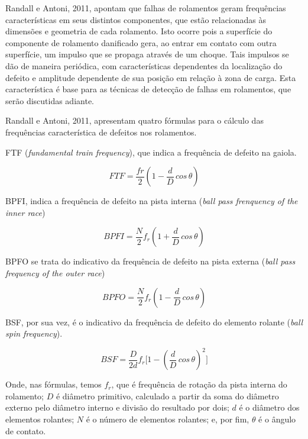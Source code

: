 \documentclass[
	12pt,				
	oneside,			
	a4paper,			
	english,			
	brazil,			
	]{abntex2ppgsi}
\begin{document}
Randall e Antoni, 2011, apontam que falhas de rolamentos geram frequências características em seus distintos componentes, que estão relacionadas às dimensões e geometria de cada rolamento. Isto ocorre pois a superfície do componente de rolamento danificado gera, ao entrar em contato com outra superfície, um impulso que se propaga através de um choque. Tais impulsos se dão de maneira periódica, com características dependentes da localização do defeito e amplitude dependente de sua posição em relação à zona de carga. Esta característica é base para as técnicas de detecção de falhas em rolamentos, que serão discutidas adiante.


Randall e Antoni, 2011, apresentam quatro fórmulas para o cálculo das frequências característica de defeitos nos rolamentos.

FTF (\textit{fundamental train frequency}), que indica a frequência de defeito na gaiola.

\begin{equation}
	FTF = \frac{fr}{2} \left ( 1 - \frac{d}{D} \,cos \, \theta \right ) 
	\label{eq: FTF}
\end{equation}

BPFI, indica a frequência de defeito na pista interna (\textit{ball pass frenquency of the inner race})

\begin{equation}
	BPFI = \frac{N}{2}f_{r} \left ( 1 + \frac{d}{D} \,cos \, \theta \right ) 
	\label{eq: BPFI}
\end{equation}

BPFO se trata do indicativo da frequência de defeito na pista externa (\textit{ball pass frequency of the outer race})

\begin{equation}
	BPFO = \frac{N}{2}f_{r} \left ( 1 - \frac{d}{D} \,cos \, \theta \right )
	\label{eq: BPFO}
\end{equation}

BSF, por sua vez, é o indicativo da frequência de defeito do elemento rolante (\textit{ball spin frequency}).

\begin{equation}
	BSF = \frac{D}{2d}f_{r} \Bigg[  1 - \left ( \frac{d}{D} \,cos \, \theta \right ) ^{2}  \Bigg]
	\label{eq: BSF}
\end{equation}

Onde, nas fórmulas, temos $f_{r}$, que é frequência de rotação da pista interna do rolamento; $D$ é diâmetro primitivo, calculado a partir da soma do diâmetro externo pelo diâmetro interno e divisão do resultado por dois; $d$ é o diâmetro dos elementos rolantes; $N$ é o número de elementos rolantes; e, por fim, $\theta$ é o ângulo de contato.
\end{document}
